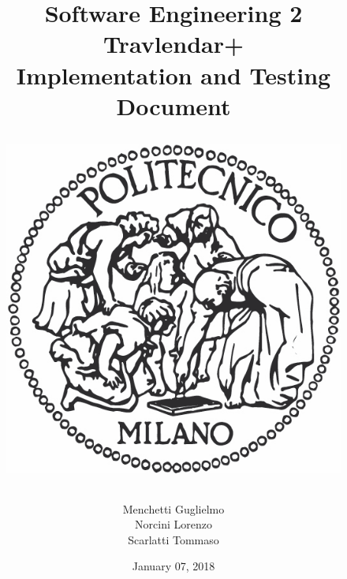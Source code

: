 \documentclass[12pt, a4paper]{article}
\begin{document}

\title{Software Engineering 2\\ \vspace{1em}  {\textbf{Travlendar+}} \\ \vspace{1em} \textbf{I}mplementation and \textbf{T}esting \textbf{D}ocument
	\vspace{1.5em}
\begin{figure}[H]
	\centering
	\includegraphics[scale=0.4]{logo}
\end{figure}
}
\author{Menchetti Guglielmo\\ Norcini Lorenzo \\ Scarlatti Tommaso}

\date{January 07, 2018}

\maketitle

\newpage
\tableofcontents

\newpage


\newpage

\newpage

\newpage

\newpage

\newpage

\newpage



\newpage
\appendix
\end{document}
